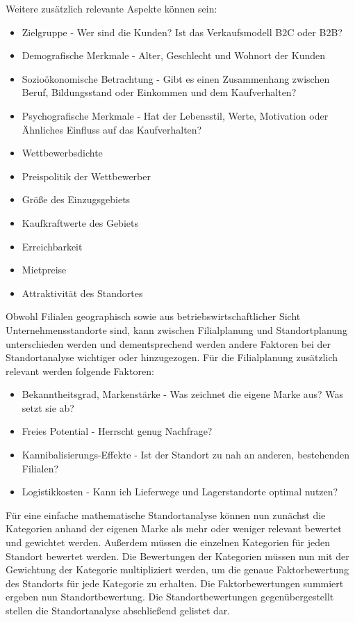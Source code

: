 \newpage
Weitere zusätzlich relevante Aspekte können sein:
\begin{itemize}
	\item Zielgruppe - Wer sind die Kunden? Ist das Verkaufsmodell B2C oder B2B?
	\item Demografische Merkmale - Alter, Geschlecht und Wohnort der Kunden
	\item Sozioökonomische Betrachtung - Gibt es einen Zusammenhang zwischen Beruf, Bildungsstand oder Einkommen und dem Kaufverhalten?
	\item Psychografische Merkmale - Hat der Lebensstil, Werte, Motivation oder Ähnliches Einfluss auf das Kaufverhalten?
	\item Wettbewerbsdichte
	\item Preispolitik der Wettbewerber
	\item Größe des Einzugsgebiets
	\item Kaufkraftwerte des Gebiets
	\item Erreichbarkeit
	\item Mietpreise
	\item Attraktivität des Standortes
\end{itemize}

Obwohl Filialen geographisch sowie aus betriebswirtschaftlicher Sicht Unternehmensstandorte sind, kann zwischen Filialplanung und Standortplanung unterschieden werden und dementsprechend werden andere Faktoren bei der Standortanalyse wichtiger oder hinzugezogen.
Für die Filialplanung zusätzlich relevant werden folgende Faktoren:

\begin{itemize}
	\item Bekanntheitsgrad, Markenstärke - Was zeichnet die eigene Marke aus? Was setzt sie ab?
	\item Freies Potential - Herrscht genug Nachfrage?
	\item Kannibalisierungs-Effekte - Ist der Standort zu nah an anderen, bestehenden Filialen?
	\item Logistikkosten - Kann ich Lieferwege und Lagerstandorte optimal nutzen?
\end{itemize}

Für eine einfache mathematische Standortanalyse können nun zunächst die Kategorien anhand der eigenen Marke als mehr oder weniger relevant bewertet und gewichtet werden.
Außerdem müssen die einzelnen Kategorien für jeden Standort bewertet werden. 
Die Bewertungen der Kategorien müssen nun mit der Gewichtung der Kategorie multipliziert werden, um die genaue Faktorbewertung des Standorts für jede Kategorie zu erhalten. 
Die Faktorbewertungen summiert ergeben nun Standortbewertung. 
Die Standortbewertungen gegenübergestellt stellen die Standortanalyse abschließend gelistet dar.

